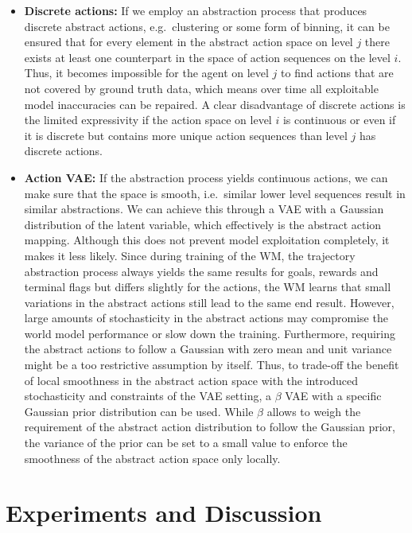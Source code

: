 \documentclass{article}
\begin{document}
\begin{itemize}
    \item \textbf{Discrete actions:} If we employ an abstraction process that produces discrete abstract actions, e.g.\ clustering or some form of binning, it can be ensured that for every element in the abstract action space on level $j$ there exists at least one counterpart in the space of action sequences on the level $i$. Thus, it becomes impossible for the agent on level $j$ to find actions that are not covered by ground truth data, which means over time all exploitable model inaccuracies can be repaired. A clear disadvantage of discrete actions is the limited expressivity if the action space on level $i$ is continuous or even if it is discrete but contains more unique action sequences than level $j$ has discrete actions.
    \item \textbf{Action VAE:} If the abstraction process yields continuous actions, we can make sure that the space is smooth, i.e.\ similar lower level sequences result in similar abstractions. We can achieve this through a VAE with a Gaussian distribution of the latent variable, which effectively is the abstract action mapping. Although this does not prevent model exploitation completely, it makes it less likely. Since during training of the WM, the trajectory abstraction process always yields the same results for goals, rewards and terminal flags but differs slightly for the actions, the WM learns that small variations in the abstract actions still lead to the same end result. However, large amounts of stochasticity in the abstract actions may compromise the world model performance or slow down the training. Furthermore, requiring the abstract actions to follow a Gaussian with zero mean and unit variance might be a too restrictive assumption by itself. Thus, to trade-off the benefit of local smoothness in the abstract action space with the introduced stochasticity and constraints of the VAE setting, a $\beta$ VAE 
    with a specific Gaussian prior distribution can be used. While $\beta$ allows to weigh the requirement of the abstract action distribution to follow the Gaussian prior, the variance of the prior can be set to a small value to enforce the smoothness of the abstract action space only locally.
    
\end{itemize}

\section{Experiments and Discussion}\label{sec:experimens_and_discussion}
\end{document}
